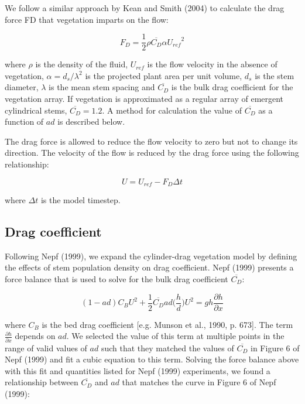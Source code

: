 \documentclass[11pt]{article}
\begin{document}
We follow a similar approach by Kean and Smith (2004) to calculate the drag force FD that vegetation imparts on the flow:

\begin{equation}
F_D = \frac{1}{2} \rho \overline{C_D} \alpha {U_{ref}}^2
\end{equation}

\noindent where $\rho$ is the density of the fluid, $U_{ref}$ is the flow velocity in the absence of vegetation, $\alpha=d_s/\lambda^2$ is the projected plant area per unit volume, $d_s$ is the stem diameter, $\lambda$ is the mean stem spacing and $\overline{C_D}$ is the bulk drag coefficient for the vegetation array. If vegetation is approximated as a regular array of emergent cylindrical stems, $\overline{C_D} = 1.2$. A method for calculation the value of $\overline{C_D}$ as a function of $ad$ is described below.

The drag force is allowed to reduce the flow velocity to zero but not to change its direction. The velocity of the flow is reduced by the drag force using the following relationship:

\begin{equation}
U = U_{ref} - F_D \Delta t
\end{equation}

\noindent where $\Delta t$ is the model timestep.

\subsection{Drag coefficient}

Following Nepf (1999), we expand the cylinder-drag vegetation model by defining the effects of stem population density on drag coefficient. Nepf (1999) presents a force balance that is used to solve for the bulk drag coefficient $\overline{C_D}$:

\begin{equation}
(1 - a d) C_B U^2 + \frac{1}{2} \overline{C_D} a d \big(\frac{h}{d}\big) U^2 = g h \frac{\partial h}{\partial x}
\end{equation}

\noindent where $C_B$ is the bed drag coefficient [e.g. Munson et al., 1990, p. 673]. The term $\frac{\partial h}{\partial x}$ depends on $a d$. We selected the value of this term at multiple points in the range of valid values of $a d$ such that they matched the values of $\overline{C_D}$ in Figure 6 of Nepf (1999) and fit a cubic equation to this term. Solving the force balance above with this fit and quantities listed for Nepf (1999) experiments, we found a relationship between $\overline{C_D}$ and $a d$ that matches the curve in Figure 6 of Nepf (1999):
\end{document}
